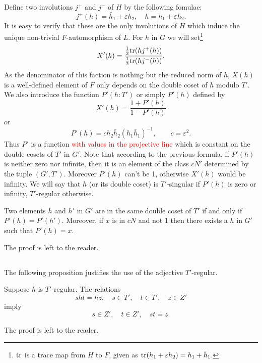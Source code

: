 Define two involutions $j^+$ and $j^-$ of $H$ by the following fomulae:
\begin{equation}
j^{\pm}(h) = \bar{h}_1 \pm \varepsilon h_2, \quad h = h_1 + \varepsilon h_2.
\end{equation}
It is easy to verify that these are the only involutions of $H$ which induce the unique non-trivial $F$-automorphism of $L$.
For $h$ in $G$ we will set\footnote{$\mathrm{tr}$ is a trace map from $H$ to $F$, given as $\mathrm{tr}(h_1 + \varepsilon h_2) = h_1 + \bar{h}_1$.}
\begin{equation}
\label{eqn:1.1.4}
X'(h) = \frac{\frac{1}{2}\mathrm{tr}(hj^+(h))}{\frac{1}{2}\mathrm{tr}(hj^{-}(h))}.
\end{equation}
As the denominator of this faction is nothing but the reduced norm of $h$, $X(h)$ is a well-defined element of $F$ only depends on the double coset of $h$ modulo $T'$.
We also introduce the function $P'(h:T')$ or simply $P'(h)$ defined by
\begin{equation}
X'(h) = \frac{1 + P'(h)}{1 - P'(h)}
\end{equation}
or
\begin{equation}
P'(h) = ch_{2}\bar{h}_2{(h_{1}\bar{h}_1)}^{-1}, \qquad c = \varepsilon^2.
\end{equation}
Thus $P'$ is a function \textcolor{red}{with values in the projective line} which is constant on the double cosets of $T'$ in $G'$.
Note that according to the previous formula, if $P'(h)$ is neither zero nor infinite, then it is an element of the class $cN'$ determined by the tuple $(G', T')$.
Moreover $P'(h)$ can't be 1, otherwise $X'(h)$ would be infinity.
We will say that $h$ (or its double coset) is $T'$-singular if $P'(h)$ is zero or infinity, $T'$-regular otherwise.

\begin{proposition}
Two elements $h$ and $h'$ in $G'$ are in the same double coset of $T'$ if and only if $P'(h) = P'(h')$.
Moreover, if $x$ is in $cN$ and not 1 then there exists a $h$ in $G'$ such that $P'(h) = x$.
\end{proposition}
The proof is left to the reader.

\subsection{}
The following proposition justifies the use of the adjective $T'$-regular.
\begin{proposition}
Suppose $h$ is $T'$-regular.    
The relations
\[
sht = hz,\quad s \in T',\quad t\in T', \quad z \in Z'
\]
imply
\[
s \in Z',\quad t\in Z',\quad st = z.
\]
\end{proposition}
The proof is left to the reader.

